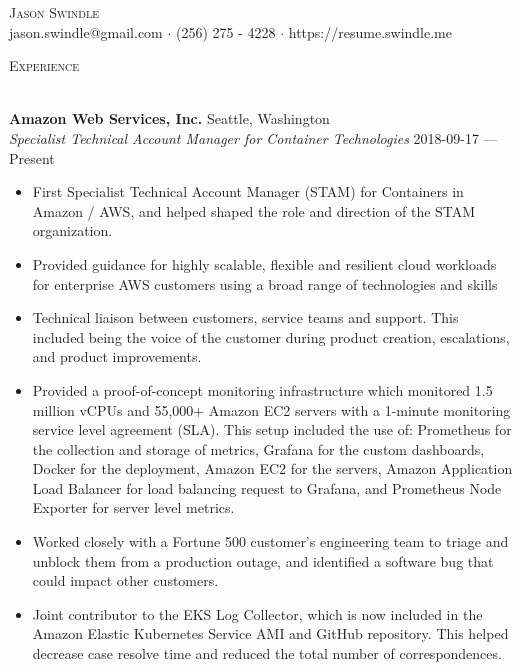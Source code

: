 \documentclass[a4paper]{article}
\newcommand{\lineunder} {
    \vspace*{-8pt} \\
    \hspace*{-18pt} \hrulefill \\
}
\newcommand{\header} [1] {
    {\hspace*{-18pt}\vspace*{6pt} \textsc{#1}}
    \vspace*{-6pt} \lineunder
}
\begin{document}
\vspace*{-40pt}

\vspace*{-10pt}
\begin{center}
    {\Huge \scshape {Jason Swindle}} \\[1\baselineskip]
    jason.swindle@gmail.com $\cdot$ (256) 275 - 4228 $\cdot$ https://resume.swindle.me \\[1\baselineskip]
\end{center}

\header{Experience}
\vspace{1mm}

\textbf{Amazon Web Services, Inc.} \hfill{Seattle, Washington} \\
\textit{Specialist Technical Account Manager for Container Technologies} \hfill{2018-09-17 --- Present} \\
\vspace{-1mm}
\begin{itemize} \itemsep 1pt
    \item First Specialist Technical Account Manager (STAM) for Containers in Amazon / AWS, and helped shaped the role and direction of the STAM organization.
    \item Provided guidance for highly scalable, flexible and resilient cloud workloads for enterprise AWS customers using a broad range of technologies and skills
    \item Technical liaison between customers, service teams and support. This included being the voice of the customer during product creation, escalations, and product improvements.
    \item Provided a proof-of-concept monitoring infrastructure which monitored 1.5 million vCPUs and 55,000+ Amazon EC2 servers with a 1-minute monitoring service level agreement (SLA). This setup included the use of: Prometheus for the collection and storage of metrics, Grafana for the custom dashboards, Docker for the deployment, Amazon EC2 for the servers, Amazon Application Load Balancer for load balancing request to Grafana, and Prometheus Node Exporter for server level metrics.
    \item Worked closely with a Fortune 500 customer's engineering team to triage and unblock them from a production outage, and identified a software bug that could impact other customers.
    \item Joint contributor to the \textquotedbl{}EKS Log Collector\textquotedbl{}, which is now included in the Amazon Elastic Kubernetes Service AMI and GitHub repository. This helped decrease case resolve time and reduced the total number of correspondences.
\end{itemize}
\end{document}
